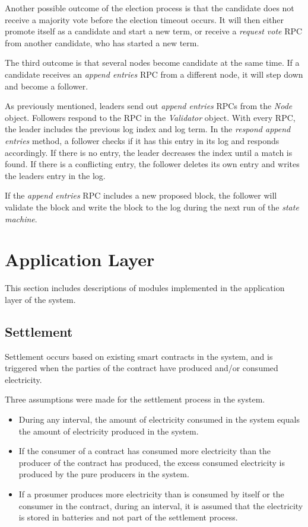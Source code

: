 Another possible outcome of the election process is that the candidate does not receive a majority vote before the election timeout occurs. It will then either promote itself as a candidate and start a new term, or receive a \textit{request vote} RPC from another candidate, who has started a new term.

The third outcome is that several nodes become candidate at the same time. If a candidate receives an \textit{append entries} RPC from a different node, it will step down and become a follower. 

As previously mentioned, leaders send out \textit{append entries} RPCs from the \textit{Node} object. Followers respond to the RPC in the \textit{Validator} object. With every RPC, the leader includes the previous log index and log term. In the \textit{respond append entries} method, a follower checks if it has this entry in its log and responds accordingly. If there is no entry, the leader decreases the index until a match is found. If there is a conflicting entry, the follower deletes its own entry and writes the leaders entry in the log. 

If the \textit{append entries} RPC includes a new proposed block, the follower will validate the block and write the block to the log during the next run of the \textit{state machine}. 


\section{Application Layer}
This section includes descriptions of modules implemented in the application layer of the system. 

\subsection{Settlement} \label{settlement}
Settlement occurs based on existing smart contracts in the system, and is triggered when the parties of the contract have produced and/or consumed electricity. 

Three assumptions were made for the settlement process in the system.
\begin{itemize}
\item During any interval, the amount of electricity consumed in the system equals the amount of electricity produced in the system.
\item If the consumer of a contract has consumed more electricity than the producer of the contract has produced, the excess consumed electricity is produced by the pure producers in the system.
\item If a prosumer produces more electricity than is consumed by itself or the consumer in the contract, during an interval, it is assumed that the electricity is stored in batteries and not part of the settlement process.
\end{itemize}

